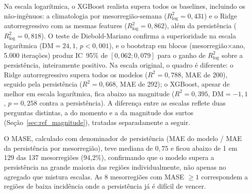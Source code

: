 Na escala logarítmica, o XGBoost realista supera todos os baselines, incluindo os não-ingênuos: a climatologia por mesorregião-semana ($R^2_{\log}=0{,}431$) e o Ridge autorregressivo com as mesmas features ($R^2_{\log}=0{,}862$), além da persistência ($R^2_{\log}=0{,}818$). O teste de Diebold-Mariano confirma a superioridade na escala logarítmica ($\mathrm{DM}=24{,}1$, $p < 0{,}001$), e o bootstrap em blocos (mesorregião$\times$ano, 5.000 iterações) produz IC~95\% de $[0{,}062; 0{,}079]$ para o ganho de $R^2_{\log}$ sobre a persistência, inteiramente positivo. Na escala original, o quadro é diferente: o Ridge autorregressivo supera todos os modelos ($R^2=0{,}788$, MAE de 200), seguido pela persistência ($R^2=0{,}668$, MAE de 292); o XGBoost, apesar de melhor em escala logarítmica, fica abaixo na magnitude ($R^2=0{,}395$, $\mathrm{DM}=-1{,}1$, $p=0{,}258$ contra a persistência). A diferença entre as escalas reflete duas perguntas distintas, a do momento e a da magnitude dos surtos (Seção~\ref{sec:ref_magnitude}), tratadas separadamente a seguir.

O MASE, calculado com denominador de persistência (MAE do modelo / MAE da persistência por mesorregião), teve mediana de $0{,}75$ e ficou abaixo de 1 em 129 das 137 mesorregiões (94,2\%), confirmando que o modelo supera a persistência na grande maioria das regiões individualmente, não apenas no agregado que mistura escalas. As 8 mesorregiões com MASE $\geq 1$ correspondem a regiões de baixa incidência onde a persistência já é difícil de vencer.

